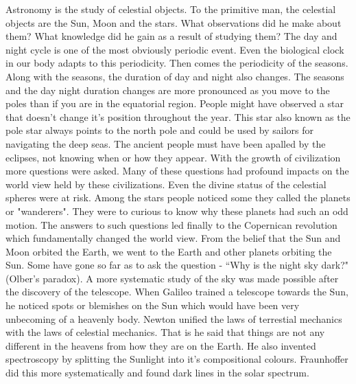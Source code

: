 \documentclass{../template/texnote}
\begin{document}
Astronomy is the study of celestial objects. To the primitive man, the celestial objects are the Sun, Moon and the stars.
What observations did he make about them?
What knowledge did he gain as a result of studying them?
The day and night cycle is one of the most obviously periodic event. Even the biological clock in our body adapts to this periodicity.
Then comes the periodicity of the seasons.
Along with the seasons, the duration of day and night also changes.
The seasons and the day night duration changes are more pronounced as you move to the poles than if you are in the equatorial region.
People might have observed a star that doesn't change it's position throughout the year.
This star also known as the pole star always points to the north pole and could be used by sailors for navigating the deep seas.
The ancient people must have been apalled by the eclipses, not knowing when or how they appear. 
With the growth of civilization more questions were asked.
Many of these questions had profound impacts on the world view held by these civilizations.
Even the divine status of the celestial spheres were at risk.
Among the stars people noticed some they called the planets or "wanderers".
They were to curious to know why these planets had such an odd motion.
The answers to such questions led finally to the Copernican revolution which fundamentally changed the world view. From the belief that the Sun and Moon orbited the Earth, we went to the Earth and other planets orbiting the Sun.
Some have gone so far as to ask the question - ``Why is the night sky dark?" (Olber's paradox). 
A more systematic study of the sky was made possible after the discovery of the telescope.
When Galileo trained a telescope towards the Sun, he noticed spots or blemishes on the Sun which would have been very unbecoming of a heavenly body.
Newton unified the laws of terrestial mechanics with the laws of celestial mechanics. That is he said that things are not any different in the heavens from how they are on the Earth.
He also invented spectroscopy by splitting the Sunlight into it's compositional colours.
Fraunhoffer did this more systematically and found dark lines in the solar spectrum.
\end{document}
